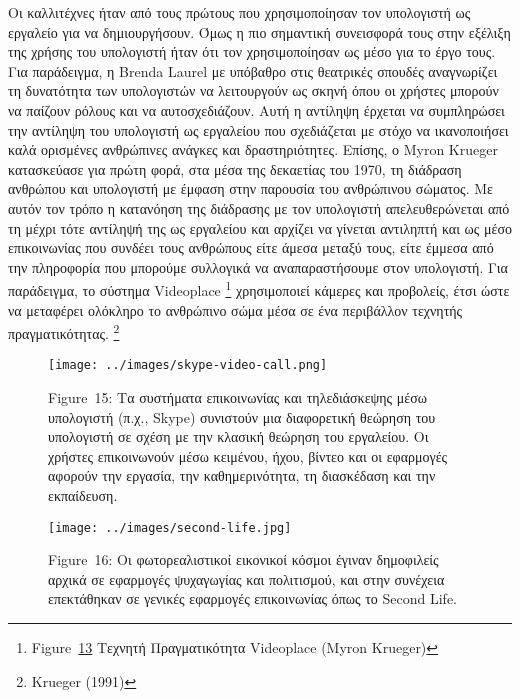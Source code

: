 \documentclass[
]{article}
\begin{document}
Οι καλλιτέχνες ήταν από τους πρώτους που χρησιμοποίησαν τον υπολογιστή
ως εργαλείο για να δημιουργήσουν. Όμως η πιο σημαντική συνεισφορά τους
στην εξέλιξη της χρήσης του υπολογιστή ήταν ότι τον χρησιμοποίησαν ως
μέσο για το έργο τους. Για παράδειγμα, η Brenda Laurel με υπόβαθρο στις
θεατρικές σπουδές αναγνωρίζει τη δυνατότητα των υπολογιστών να
λειτουργούν ως σκηνή όπου οι χρήστες μπορούν να παίζουν ρόλους και να
αυτοσχεδιάζουν. Αυτή η αντίληψη έρχεται να συμπληρώσει την αντίληψη του
υπολογιστή ως εργαλείου που σχεδιάζεται με στόχο να ικανοποιήσει καλά
ορισμένες ανθρώπινες ανάγκες και δραστηριότητες. Επίσης, ο Myron Krueger
κατασκεύασε για πρώτη φορά, στα μέσα της δεκαετίας του 1970, τη διάδραση
ανθρώπου και υπολογιστή με έμφαση στην παρουσία του ανθρώπινου σώματος.
Με αυτόν τον τρόπο η κατανόηση της διάδρασης με τον υπολογιστή
απελευθερώνεται από τη μέχρι τότε αντίληψή της ως εργαλείου και αρχίζει
να γίνεται αντιληπτή και ως μέσο επικοινωνίας που συνδέει τους ανθρώπους
είτε άμεσα μεταξύ τους, είτε έμμεσα από την πληροφορία που μπορούμε
συλλογικά να αναπαραστήσουμε στον υπολογιστή. Για παράδειγμα, το σύστημα
Videoplace \footnote{Figure~\protect\hyperlink{fig:videoplace}{13}
  Τεχνητή Πραγματικότητα Videoplace (Myron Krueger)} χρησιμοποιεί
κάμερες και προβολείς, έτσι ώστε να μεταφέρει ολόκληρο το ανθρώπινο σώμα
μέσα σε ένα περιβάλλον τεχνητής πραγματικότητας. \footnote{Krueger
  (1991)}

\leavevmode{}%
\begin{figure}
\hypertarget{fig:skype-video-call}{%
\centering
\texttt{[image: ../images/skype-video-call.png]}
\caption{Figure~15: Τα συστήματα επικοινωνίας και τηλεδιάσκεψης μέσω
υπολογιστή (π.χ., Skype) συνιστούν μια διαφορετική θεώρηση του
υπολογιστή σε σχέση με την κλασική θεώρηση του εργαλείου. Οι χρήστες
επικοινωνούν μέσω κειμένου, ήχου, βίντεο και οι εφαρμογές αφορούν την
εργασία, την καθημερινότητα, τη διασκέδαση και την
εκπαίδευση.}\label{fig:skype-video-call}
}
\end{figure}

\leavevmode{}%
\begin{figure}
\hypertarget{fig:second-life}{%
\centering
\texttt{[image: ../images/second-life.jpg]}
\caption{Figure~16: Οι φωτορεαλιστικοί εικονικοί κόσμοι έγιναν
δημοφιλείς αρχικά σε εφαρμογές ψυχαγωγίας και πολιτισμού, και στην
συνέχεια επεκτάθηκαν σε γενικές εφαρμογές επικοινωνίας όπως το Second
Life.}\label{fig:second-life}
}
\end{figure}
\end{document}
